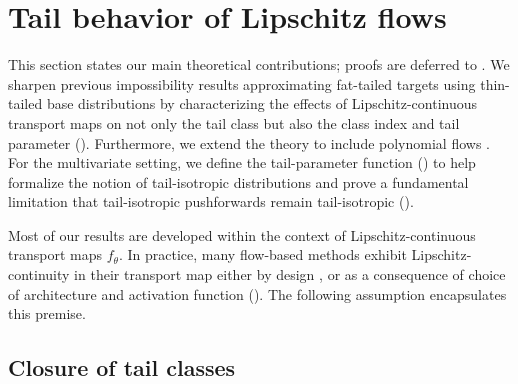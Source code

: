 \documentclass[twoside]{article}
\theoremstyle{definition}
\newtheorem{assumption}[theorem]{Assumption}
\theoremstyle{remark}
\begin{document}
\section{Tail behavior of Lipschitz flows}

\vspace{-1mm}
This section states our main theoretical contributions; proofs are deferred to .
We sharpen previous impossibility results approximating fat-tailed targets
using thin-tailed base distributions \citep[Theorem 4]{jaini2020tails}
by characterizing the effects of Lipschitz-continuous transport maps on not only the tail class
but also the class index and tail parameter (). Furthermore, we extend the theory
to include polynomial flows \citep{jaini2019sum}. For the multivariate setting,
we define the tail-parameter function () to help formalize the notion
of tail-isotropic distributions and prove a fundamental limitation that tail-isotropic
pushforwards remain tail-isotropic ().

Most of our results are developed within the context of Lipschitz-continuous transport maps $f_\theta$.
In practice, many flow-based methods exhibit Lipschitz-continuity in their transport map either by design \citep{grathwohl2018ffjord,chen2019residual}, or as a consequence of choice of architecture and activation function (). %
%
The following assumption encapsulates this premise.


\vspace{-2mm}
\subsection{Closure of tail classes}
\label{ssec:failure}
\end{document}
